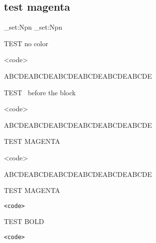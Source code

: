 \subsection{ test magenta}
\bgroup
\def\MAGENTA{}
\makeatletter
\ExplSyntaxOn
\def\CDR@Debug#1{\typeout{**** DEBUG #1}}
\cs_set:Npn \FVB@RAW {
  \FV@VerbatimBegin
  \MAGENTA
  \FV@Scan
}
\cs_set:Npn \FVE@RAW {
  \FV@VerbatimEnd
}
\ExplSyntaxOff
{}
\makeatother
\begin{codebox}{TEST no color}
\begin{RAW}
<code>
\end{RAW}
\end{codebox}
ABCDEABCDEABCDEABCDEABCDEABCDE
\begin{codebox}{TEST \string\color\ before the block}
\color{magenta}
\begin{RAW}
<code>
\end{RAW}
\end{codebox}
ABCDEABCDEABCDEABCDEABCDEABCDE
\begin{codebox}{TEST MAGENTA}
\def\MAGENTA{\color{magenta}}
\begin{RAW}
<code>
\end{RAW}
\end{codebox}
ABCDEABCDEABCDEABCDEABCDEABCDE
\begin{codebox}{TEST MAGENTA}
\begin{Verbatim}[formatcom=\color{magenta}]
<code>
\end{Verbatim}
\end{codebox}
\begin{codebox}{TEST BOLD}
\begin{Verbatim}[formatcom=\bfseries]
<code>
\end{Verbatim}
\end{codebox}
\egroup
%
